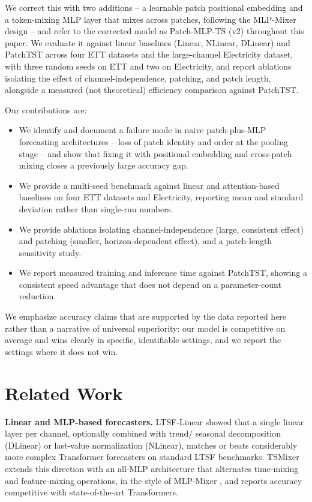 \documentclass[conference]{IEEEtran}
\begin{document}
We correct this with two additions -- a learnable patch positional embedding and a
token-mixing MLP layer that mixes across patches, following the MLP-Mixer design
\cite{tolstikhin2021mlpmixer} -- and refer to the corrected model as Patch-MLP-TS
(v2) throughout this paper. We evaluate it against linear baselines (Linear, NLinear,
DLinear) and PatchTST across four ETT datasets and the large-channel Electricity
dataset, with three random seeds on ETT and two on Electricity, and report ablations
isolating the effect of channel-independence, patching, and patch length, alongside
a measured (not theoretical) efficiency comparison against PatchTST.

Our contributions are:
\begin{itemize}
\item We identify and document a failure mode in naive patch-plus-MLP forecasting
architectures -- loss of patch identity and order at the pooling stage -- and show
that fixing it with positional embedding and cross-patch mixing closes a
previously large accuracy gap.
\item We provide a multi-seed benchmark against linear and attention-based baselines
on four ETT datasets and Electricity, reporting mean and standard deviation rather
than single-run numbers.
\item We provide ablations isolating channel-independence (large, consistent
effect) and patching (smaller, horizon-dependent effect), and a patch-length
sensitivity study.
\item We report measured training and inference time against PatchTST, showing a
consistent speed advantage that does not depend on a parameter-count reduction.
\end{itemize}

We emphasize accuracy claims that are supported by the data reported here rather
than a narrative of universal superiority: our model is competitive on average and
wins clearly in specific, identifiable settings, and we report the settings where
it does not win.

\section{Related Work}

\textbf{Linear and MLP-based forecasters.} LTSF-Linear \cite{zeng2023transformers}
showed that a single linear layer per channel, optionally combined with trend/
seasonal decomposition (DLinear) or last-value normalization (NLinear), matches or
beats considerably more complex Transformer forecasters on standard LTSF
benchmarks. TSMixer \cite{chen2023tsmixer} extends this direction with an all-MLP
architecture that alternates time-mixing and feature-mixing operations, in the
style of MLP-Mixer \cite{tolstikhin2021mlpmixer}, and reports accuracy competitive
with state-of-the-art Transformers.
\end{document}

